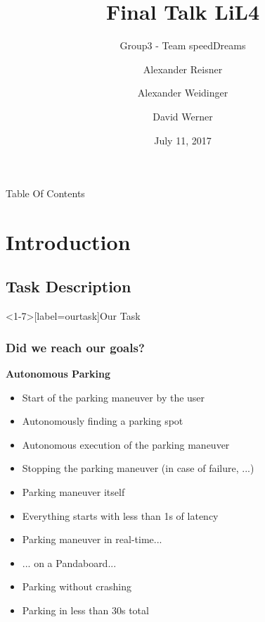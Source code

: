 \documentclass[aspectratio=169]{beamer}
\title{Final Talk LiL4}
\subtitle{Group3 - Team speedDreams}
\date{July 11, 2017}
\author{Alexander Reisner \and
Alexander Weidinger \and
David Werner}
\institute{Technische Universität München}
\begin{document}
  \renewcommand{\figurename}{\tiny Fig.}
  \maketitle

\begin{frame}{Table Of Contents}
  \begin{multicols}{2}
  \tableofcontents
\end{multicols}
  \end{frame}

  \section{Introduction}

  \subsection{Task Description}
  \begin{frame}<1-7>[label=ourtask]{Our Task}
    \frametitle<8>{Did we reach our goals?}
    \textbf{Autonomous Parking}
    \begin{itemize}
      \item<2-> Start of the parking maneuver by the user 
      \item<2-> Autonomously finding a parking spot 
      \item<2-> Autonomous execution of the parking maneuver 
      \item<2-> Stopping the parking maneuver (in case of failure, ...) \uncover<8>{\ding{51}}
      \item<2-> Parking maneuver itself 
    \end{itemize}
    \begin{itemize}
      \item<4-> Everything starts with less than 1s of latency 
      \item<4-> Parking maneuver in real-time... 
      \item<5-> ... on a Pandaboard...  \uncover<8>{\ding{51}}
      \item<7-> Parking without crashing 
      \item<7-> Parking in less than 30s total 
    \end{itemize}
  \end{frame}
\end{document}
